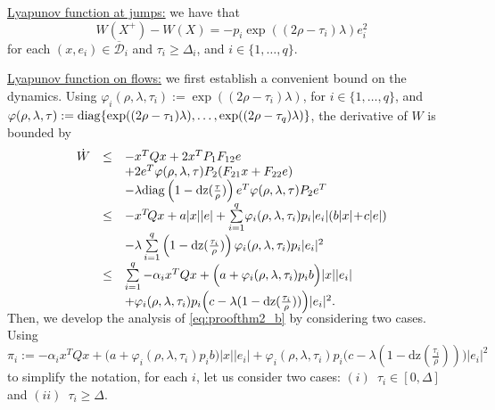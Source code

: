 \documentclass[twocolumn]{autart}
\newcommand\diag{{\rm diag}}
\newcommand\dz{\mathrm{dz}}
\begin{document}
{ \underline{Lyapunov function at jumps:}} we have that
\begin{equation}
\label{eq:proofthm2_a}
W(X^+) -W(X)= -p_i\exp((2\rho-\tau_i)\lambda)e_i^2 
\end{equation}
for each $(x,e_i)\in\overline{\mathcal{D}}_i$ and $\tau_i \geq \Delta_i$,
and $i\in\{1,\dots, q\}$.

{ \underline{Lyapunov function on flows:}}
{ we first establish a convenient bound on the dynamics.} Using
$\varphi_i(\rho,\lambda,\tau_i) := \exp((2\rho-\tau_i)\lambda)$,
for $i\in\{1,\dots, q\}$, and 
$\varphi(\rho,\lambda,\tau) := 
\diag\{\exp((2\rho-\tau_1)\lambda),\dots,\exp((2\rho-\tau_q)\lambda)\}$,
the derivative of $W$ is bounded by 
\begin{equation}
\label{eq:proofthm2_b}
\begin{array}{lll}
\dot{W} &\leq & 
-x^TQx + 2x^T P_1F_{12} e  \\
& & + 2e^T\varphi(\rho,\lambda,\tau)P_2(F_{21}x + F_{22}e) \\
& & -\lambda \diag\left( 1-\dz(\frac{\tau}{\rho}) \right) 
e^T\varphi(\rho,\lambda,\tau)P_2e^T \\
&\leq & 
-x^T\!Qx + a|x||e|  
 + \sum\nolimits\limits_{i=1}^q \!
\varphi_i(\rho,\lambda,\tau_i)p_i|e_i| (b|x| \!+\! c|e|) \\
& & -\lambda \sum\nolimits\limits_{i=1}^q 
\left( 1-\dz(\frac{\tau_i}{\rho}) \right) 
\varphi_i(\rho,\lambda,\tau_i)
p_i|e_i|^2 \\
&\leq & 
\sum\nolimits\limits_{i=1}^q 
-\alpha_i x^TQx + \Big(a+\varphi_i(\rho,\lambda,\tau_i)p_ib\Big)|x||e_i|  \\
& & + 
\varphi_i(\rho,\lambda,\tau_i)p_i 
\Big(c- \lambda ( 1-\dz(\frac{\tau_i}{\rho}))\Big) |e_i|^2. \vspace{-5mm}\\
\end{array} \vspace{1mm}
\end{equation}

{Then, we develop the analysis of \eqref{eq:proofthm2_b}
by considering two cases}. Using 
$\pi_i := 
-\alpha_i x^TQx 
+ \Big(a+\varphi_i(\rho,\lambda,\tau_i)p_ib\Big)|x||e_i|  
+ \varphi_i(\rho,\lambda,\tau_i)p_i 
\Big(c- \lambda ( 1-\dz(\frac{\tau_i}{\rho}))\Big) |e_i|^2 $
to simplify the notation, for each $i$, 
let us consider two cases: $(i)$~$\tau_i\in [0,\Delta]$
and $(ii)$~$\tau_i\geq\Delta$. 
\end{document}
